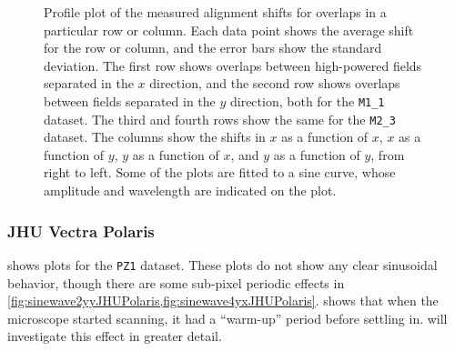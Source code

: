 \documentclass{article}
\newcommand{\M}[2]{\texttt{M#1\_#2}}
\begin{document}
\begin{figure}[ht]
\begin{subfigure}{0.24\linewidth}
		\caption{}
		\label{fig:sinewave4yy2}
	\end{subfigure}
	\caption{Profile plot of the measured alignment shifts for overlaps in a particular row or column.  Each data point shows the average shift for the row or column, and the error bars show the standard deviation.  The first row shows overlaps between high-powered fields separated in the $x$ direction, and the second row shows overlaps between fields separated in the $y$ direction, both for the \M11 dataset.  The third and fourth rows show the same for the \M23 dataset.  The columns show the shifts in $x$ as a function of $x$, $x$ as a function of $y$, $y$ as a function of $x$, and $y$ as a function of $y$, from right to left.  Some of the plots are fitted to a sine curve, whose amplitude and wavelength are indicated on the plot.}
	\label{fig:sinewaves}
\end{figure}

\subsubsection{JHU Vectra Polaris}
\label{sec:JHUpolarisperiodic}

 shows plots for the \texttt{PZ1} dataset.  These plots do not show any clear sinusoidal behavior, though there are some sub-pixel periodic effects in \cref{fig:sinewave2yyJHUPolaris,fig:sinewave4yxJHUPolaris}.   shows that when the microscope started scanning, it had a ``warm-up'' period before settling in.   will investigate this effect in greater detail.
\end{document}
